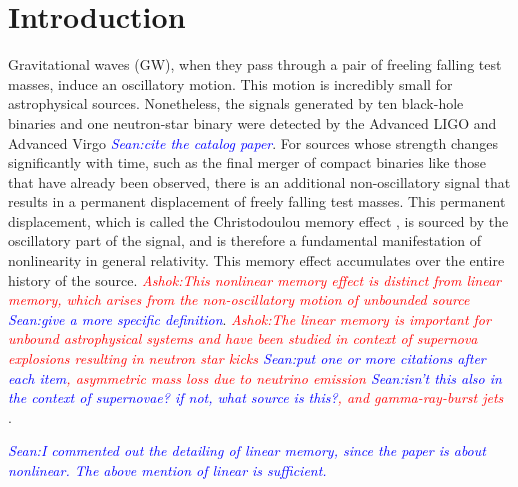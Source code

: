 \documentclass[twocolumn,showpacs,aps,prd,nobibnotes,floatfix]{revtex4-1}
\newcommand{\ashok}[1]{\textcolor{red}{\textit{Ashok:#1}}}
\newcommand{\stm}[1]{\textcolor{blue}{\textit{Sean:#1}}}
\begin{document}
\maketitle

\section{Introduction}

Gravitational waves (GW), when they pass through a pair of freeling falling test masses, induce an oscillatory motion. This motion is incredibly small for astrophysical sources. Nonetheless, the signals generated by ten black-hole binaries and one neutron-star binary were detected by the Advanced LIGO and Advanced Virgo\cite{Ligocatalog2018} \stm{cite the catalog paper}. For sources whose strength changes significantly with time, such as the final merger of compact binaries like those that have already been observed, there is an additional non-oscillatory signal that results in a permanent displacement of
freely falling test masses. This permanent displacement, which is called the Christodoulou memory effect \cite{Christodoulou1991}, is sourced by the oscillatory part of the signal, and is therefore a fundamental manifestation of nonlinearity in general relativity. This memory effect accumulates over the entire history of the source. \ashok{This nonlinear memory effect is distinct from linear memory, which arises from the non-oscillatory motion of unbounded source} \stm{give a more specific definition}. \ashok{The linear memory is important for unbound astrophysical systems and have been studied in context of supernova explosions resulting in neutron star kicks \cite{Burrows1996}\cite{Muller2004}\stm{put one or more citations after each item}, asymmetric mass loss due to neutrino emission \cite{COtt2009} \stm{isn't this also in the context of supernovae? if not, what source is this?}, and gamma-ray-burst jets \cite{Davies_Melvyn2002,Buonanno_Sigl2015,Kotake_Kei2009}}. 

\stm{I commented out the detailing of linear memory, since the paper is about nonlinear. The above mention of linear is sufficient.}
\end{document}
